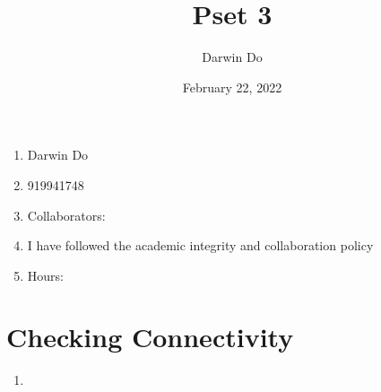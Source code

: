 \documentclass{article}
\title{Pset 3}
\begin{document}
\date{February 22, 2022 }
\author{Darwin Do}

\maketitle

\begin{enumerate}
    \item Darwin Do
    \item 919941748
    \item Collaborators: 
    \item I have followed the academic integrity and collaboration policy
    \item Hours: 
\end{enumerate}

\newpage

\section{Checking Connectivity}
\begin{enumerate}
    \item 
\end{enumerate}
\end{document}
